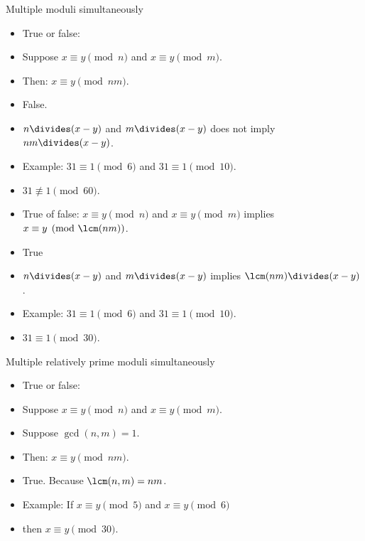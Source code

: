 \documentclass{beamer}
\begin{document}
\begin{frame}{Multiple moduli simultaneously}

\begin{itemize}
  \item True or false:
  \item Suppose $x\equiv y \pmod n$ and $x\equiv y \pmod m$.
  \item Then: $x\equiv y \pmod {nm}$.
  \item False.
  \item $n \divides (x-y)$ and $m \divides (x-y)$ does not imply $nm \divides (x-y)$.
  \item Example: $31 \equiv 1 \pmod 6$ and $31 \equiv 1 \pmod {10}$.
  \item $31 \not\equiv 1 \pmod {60}$.
  \item True of false: $x\equiv y \pmod n$ and $x\equiv y \pmod m$ implies $x\equiv y \pmod {\lcm(nm)}$.
  \item True
  \item $n \divides (x-y)$ and $m \divides (x-y)$ implies $\lcm(nm) \divides (x-y)$.
  \item Example: $31 \equiv 1 \pmod 6$ and $31 \equiv 1 \pmod {10}$.
  \item $31 \equiv 1 \pmod {30}$.
  \end{itemize}

\end{frame}

\begin{frame}{Multiple relatively prime moduli simultaneously}

\begin{itemize}
  \item True or false:
  \item Suppose $x\equiv y \pmod n$ and $x\equiv y \pmod m$.
  \item Suppose $\gcd(n,m) = 1$.
  \item Then: $x\equiv y \pmod {nm}$.
  \item True. Because $\lcm(n,m) = nm$.
  \item Example: If $x\equiv y \pmod 5$ and $x\equiv y \pmod 6$
  \item then $x\equiv y \pmod {30}$.
  \end{itemize}

\end{frame}
\end{document}
